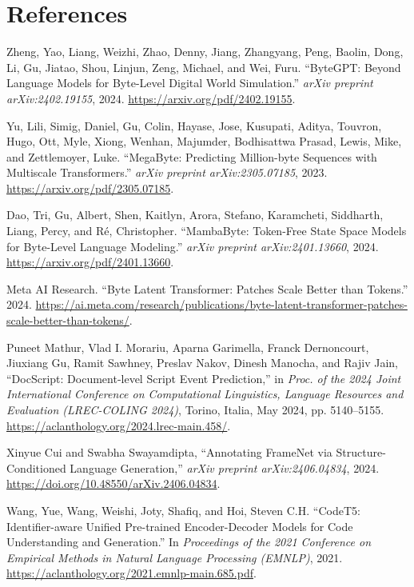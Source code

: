 \documentclass[a4paper, 11pt, twoside, openright]{report}
\begin{document}
\chapter{References}
\begin{thebibliography}{99}

 Zheng, Yao, Liang, Weizhi, Zhao, Denny, Jiang, Zhangyang, Peng, Baolin, Dong, Li, Gu, Jiatao, Shou, Linjun, Zeng, Michael, and Wei, Furu.
``ByteGPT: Beyond Language Models for Byte-Level Digital World Simulation.'' \textit{arXiv preprint arXiv:2402.19155}, 2024. \url{https://arxiv.org/pdf/2402.19155}.

 Yu, Lili, Simig, Daniel, Gu, Colin, Hayase, Jose, Kusupati, Aditya, Touvron, Hugo, Ott, Myle, Xiong, Wenhan, Majumder, Bodhisattwa Prasad, Lewis, Mike, and Zettlemoyer, Luke.
``MegaByte: Predicting Million-byte Sequences with Multiscale Transformers.'' \textit{arXiv preprint arXiv:2305.07185}, 2023. \url{https://arxiv.org/pdf/2305.07185}.

 Dao, Tri, Gu, Albert, Shen, Kaitlyn, Arora, Stefano, Karamcheti, Siddharth, Liang, Percy, and Ré, Christopher.
``MambaByte: Token-Free State Space Models for Byte-Level Language Modeling.'' \textit{arXiv preprint arXiv:2401.13660}, 2024. \url{https://arxiv.org/pdf/2401.13660}.

 Meta AI Research.
``Byte Latent Transformer: Patches Scale Better than Tokens.'' 2024. \url{https://ai.meta.com/research/publications/byte-latent-transformer-patches-scale-better-than-tokens/}.

Puneet Mathur, Vlad I. Morariu, Aparna Garimella, Franck Dernoncourt, Jiuxiang Gu, Ramit Sawhney, Preslav Nakov, Dinesh Manocha, and Rajiv Jain,  
``DocScript: Document-level Script Event Prediction,''  
in \textit{Proc. of the 2024 Joint International Conference on Computational Linguistics, Language Resources and Evaluation (LREC-COLING 2024)}, Torino, Italia, May 2024, pp. 5140--5155.  
\url{https://aclanthology.org/2024.lrec-main.458/}.

Xinyue Cui and Swabha Swayamdipta,  
``Annotating FrameNet via Structure-Conditioned Language Generation,''  
\textit{arXiv preprint arXiv:2406.04834}, 2024.  
\url{https://doi.org/10.48550/arXiv.2406.04834}.

 Wang, Yue, Wang, Weishi, Joty, Shafiq, and Hoi, Steven C.H.
``CodeT5: Identifier-aware Unified Pre-trained Encoder-Decoder Models for Code Understanding and Generation.'' In \textit{Proceedings of the 2021 Conference on Empirical Methods in Natural Language Processing (EMNLP)}, 2021. \url{https://aclanthology.org/2021.emnlp-main.685.pdf}.


\end{thebibliography}
\end{document}
